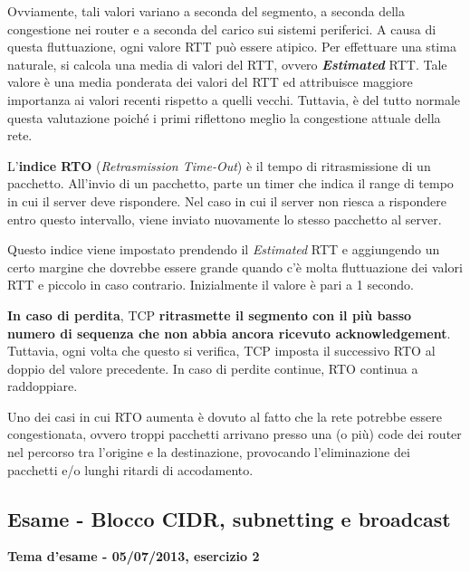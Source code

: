 \documentclass[a4paper]{article}
\begin{document}
	\noindent
	Ovviamente, tali valori variano a seconda del segmento, a seconda della congestione nei router e a seconda del carico sui sistemi periferici. A causa di questa fluttuazione, ogni valore RTT può essere atipico. Per effettuare una stima naturale, si calcola una media di valori del RTT, ovvero \emph{\textbf{Estimated}} RTT. Tale valore è una media ponderata dei valori del RTT ed attribuisce maggiore importanza ai valori recenti rispetto a quelli vecchi. Tuttavia, è del tutto normale questa valutazione poiché i primi riflettono meglio la congestione attuale della rete.\newline
	
	\label{RTO}\noindent
	L'\textcolor{Red3}{\textbf{indice RTO}} (\emph{Retrasmission Time-Out}) è il tempo di ritrasmissione di un pacchetto. All’invio di un pacchetto, parte un timer che indica il range di tempo in cui il server deve rispondere. Nel caso in cui il server non riesca a rispondere entro questo intervallo, viene inviato nuovamente lo stesso pacchetto al server.\newline
	
	\noindent
	Questo indice viene impostato prendendo il \emph{Estimated} RTT e aggiungendo un certo margine che dovrebbe essere grande quando c’è molta fluttuazione dei valori RTT e piccolo in caso contrario. Inizialmente il valore è pari a 1 secondo.\newline
	
	\noindent
	\textbf{In caso di perdita}, TCP \textbf{ritrasmette il segmento con il più basso numero di sequenza che non abbia ancora ricevuto acknowledgement}. Tuttavia, ogni volta che questo si verifica, TCP imposta il successivo RTO al doppio del valore precedente. In caso di perdite continue, RTO continua a raddoppiare.\newline
	
	\noindent
	Uno dei casi in cui RTO aumenta è dovuto al fatto che la rete potrebbe essere congestionata, ovvero troppi pacchetti arrivano presso una (o più) code dei router nel percorso tra l’origine e la destinazione, provocando l’eliminazione dei pacchetti e/o lunghi ritardi di accodamento.
	
	\newpage
	
	\subsection{\textcolor{Red3}{Esame - Blocco CIDR, subnetting e broadcast}}
	
	\begin{center}
		\large
		\textcolor{Green4}{\textbf{Tema d'esame - 05/07/2013, esercizio 2}}
	\end{center}
	
\end{document}
